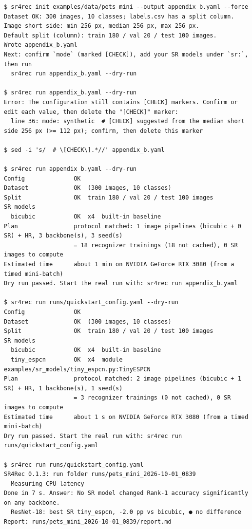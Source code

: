 \documentclass[preprint,12pt]{elsarticle}
\begin{document}
\begin{lstlisting}[style=srsh,caption={Console session: \texttt{init}, \texttt{run -{}-dry-run},
\texttt{run} and \texttt{reproduce} on the Oxford-IIIT Pet quickstart.},label=lst:console]
$ sr4rec init examples/data/pets_mini --output appendix_b.yaml --force
Dataset OK: 300 images, 10 classes; labels.csv has a split column.
Image short side: min 256 px, median 256 px, max 256 px.
Default split (column): train 180 / val 20 / test 100 images.
Wrote appendix_b.yaml
Next: confirm `mode` (marked [CHECK]), add your SR models under `sr:`, then run
  sr4rec run appendix_b.yaml --dry-run

$ sr4rec run appendix_b.yaml --dry-run
Error: The configuration still contains [CHECK] markers. Confirm or edit each value, then delete the "[CHECK]" marker:
  line 36: mode: synthetic  # [CHECK] suggested from the median short side 256 px (>= 112 px); confirm, then delete this marker

$ sed -i 's/  # \[CHECK\].*//' appendix_b.yaml

$ sr4rec run appendix_b.yaml --dry-run
Config              OK
Dataset             OK  (300 images, 10 classes)
Split               OK  train 180 / val 20 / test 100 images
SR models
  bicubic           OK  x4  built-in baseline
Plan                protocol matched: 1 image pipelines (bicubic + 0 SR) + HR, 3 backbone(s), 3 seed(s)
                    = 18 recognizer trainings (18 not cached), 0 SR images to compute
Estimated time      about 1 min on NVIDIA GeForce RTX 3080 (from a timed mini-batch)
Dry run passed. Start the real run with: sr4rec run appendix_b.yaml

$ sr4rec run runs/quickstart_config.yaml --dry-run
Config              OK
Dataset             OK  (300 images, 10 classes)
Split               OK  train 180 / val 20 / test 100 images
SR models
  bicubic           OK  x4  built-in baseline
  tiny_espcn        OK  x4  module   examples/sr_models/tiny_espcn.py:TinyESPCN
Plan                protocol matched: 2 image pipelines (bicubic + 1 SR) + HR, 1 backbone(s), 1 seed(s)
                    = 3 recognizer trainings (0 not cached), 0 SR images to compute
Estimated time      about 1 s on NVIDIA GeForce RTX 3080 (from a timed mini-batch)
Dry run passed. Start the real run with: sr4rec run runs/quickstart_config.yaml

$ sr4rec run runs/quickstart_config.yaml
SR4Rec 0.1.3: run folder runs/pets_mini_2026-10-01_0839
  Measuring CPU latency
Done in 7 s. Answer: No SR model changed Rank-1 accuracy significantly on any backbone.
  ResNet-18: best SR tiny_espcn, -2.0 pp vs bicubic, ● no difference
Report: runs/pets_mini_2026-10-01_0839/report.md


\end{lstlisting}
\end{document}
